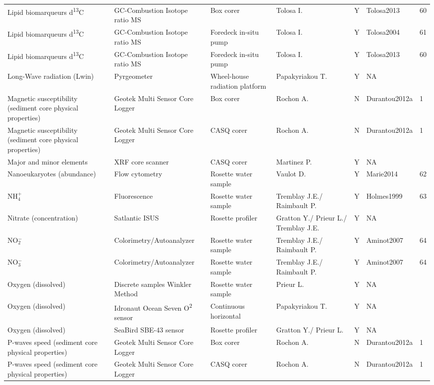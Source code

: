 \begin{ThreePartTable}
\begin{longtable}[t]{lllllll}
\addlinespace
Lipid biomarqueurs d\textsuperscript{13}C & GC-Combustion Isotope ratio MS & Box corer & Tolosa I. & Y & Tolosa2013 & 60\\
Lipid biomarqueurs d\textsuperscript{13}C & GC-Combustion Isotope ratio MS & Foredeck in-situ pump & Tolosa I. & Y & Tolosa2004 & 61\\
Lipid biomarqueurs d\textsuperscript{13}C & GC-Combustion Isotope ratio MS & Foredeck in-situ pump & Tolosa I. & Y & Tolosa2013 & 60\\
Long-Wave radiation (Lwin) & Pyrgeometer & Wheel-house radiation platform & Papakyriakou T. & Y & NA & \\
Magnetic susceptibility (sediment core physical properties) & Geotek Multi Sensor Core Logger & Box corer & Rochon A. & N & Durantou2012a & 1\\
\addlinespace
Magnetic susceptibility (sediment core physical properties) & Geotek Multi Sensor Core Logger & CASQ corer & Rochon A. & N & Durantou2012a & 1\\
Major and minor elements & XRF core scanner & CASQ corer & Martinez P. & Y & NA & \\
Nanoeukaryotes (abundance) & Flow cytometry & Rosette water sample & Vaulot D. & Y & Marie2014 & 62\\
NH$^+_4$ & Fluorescence & Rosette water sample & Tremblay J.E./ Raimbault P. & Y & Holmes1999 & 63\\
Nitrate (concentration) & Satlantic ISUS & Rosette profiler & Gratton Y./ Prieur L./ Tremblay J.E. & Y & NA & \\
\addlinespace
NO$^-_2$ & Colorimetry/Autoanalyzer & Rosette water sample & Tremblay J.E./ Raimbault P. & Y & Aminot2007 & 64\\
NO$^-_3$ & Colorimetry/Autoanalyzer & Rosette water sample & Tremblay J.E./ Raimbault P. & Y & Aminot2007 & 64\\
Oxygen (dissolved) & Discrete samples Winkler Method & Rosette water sample & Prieur L. & Y & NA & \\
Oxygen (dissolved) & Idronaut Ocean Seven O\textsuperscript{2} sensor & Continuous horizontal & Papakyriakou T. & Y & NA & \\
Oxygen (dissolved) & SeaBird SBE-43 sensor & Rosette profiler & Gratton Y./ Prieur L. & Y & NA & \\
\addlinespace
P-waves speed (sediment core physical properties) & Geotek Multi Sensor Core Logger & Box corer & Rochon A. & N & Durantou2012a & 1\\
P-waves speed (sediment core physical properties) & Geotek Multi Sensor Core Logger & CASQ corer & Rochon A. & N & Durantou2012a & 1\\

\end{longtable}
\end{ThreePartTable}
